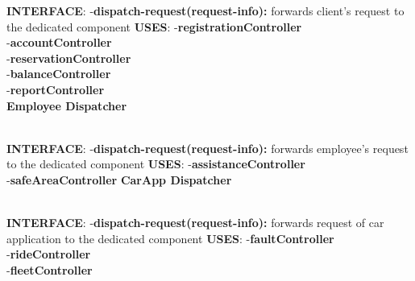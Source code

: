 \documentclass{article}
\begin{document}
\textbf{INTERFACE}: 
 \newline
-\textbf{dispatch-request(request-info):} forwards client's request to the dedicated component 
\newline
\textbf{USES}:   
\newline
-\textbf{registrationController}\\
-\textbf{accountController}\\
-\textbf{reservationController}\\
-\textbf{balanceController}\\
-\textbf{reportController}\\

\newpage
\textbf{Employee Dispatcher}\\
\begin{figure}[ht]
\end{figure}\\
\textbf{INTERFACE}: 
 \newline
-\textbf{dispatch-request(request-info):} forwards employee's request to the dedicated component   
\newline
\textbf{USES}:   
\newline
-\textbf{assistanceController}\\
-\textbf{safeAreaController}
\newpage
\textbf{CarApp Dispatcher}\\
\begin{figure}[ht]
\end{figure}\\
\textbf{INTERFACE}: 
 \newline
-\textbf{dispatch-request(request-info):}  forwards request of car application to the dedicated component
\newline
\textbf{USES}:   
\newline
-\textbf{faultController}\\
-\textbf{rideController}\\
-\textbf{fleetController}
\newpage
\end{document}
